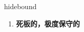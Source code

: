 
\begin{frame}
{\huge hidebound}
\begin{center}
\begin{enumerate}\Large
  \item \textbf{死板的，极度保守的}
\end{enumerate}
\end{center}
\end{frame}
